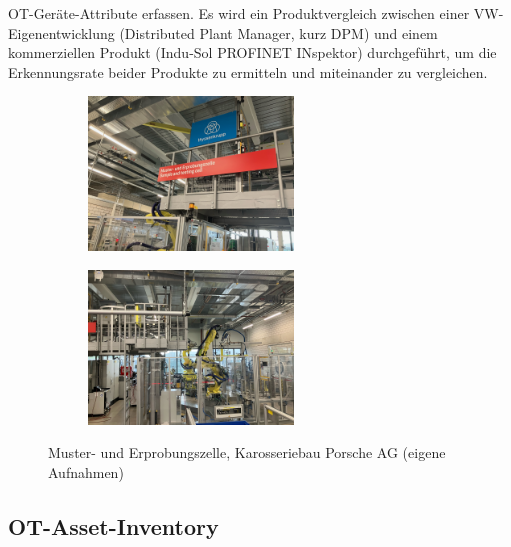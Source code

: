OT-Geräte-Attribute erfassen. \clearpage \noindent Es wird ein Produktvergleich zwischen einer VW-Eigenentwicklung (Distributed Plant Manager, kurz DPM) und einem kommerziellen Produkt (Indu-Sol PROFINET INspektor) durchgeführt, um die Erkennungsrate beider Produkte zu ermitteln und miteinander zu vergleichen. 
\bigskip
\begin{figure}[!h]
    \centering
    \begin{subfigure}[b]{\textwidth}
        \centering
        \includegraphics[width=0.6\textwidth]{images/Musterzelle.jpg}
        \caption{}
        \label{fig:Testzelle1}
    \end{subfigure}
    \vskip 0.5cm %
    \begin{subfigure}[b]{\textwidth}
        \centering
        \includegraphics[width=0.6\textwidth]{images/Mustertestzelle1.jpg}
        \label{fig:Testzelle2}
        \caption{}
    \end{subfigure}
    \caption{Muster- und Erprobungszelle, Karosseriebau Porsche AG (eigene Aufnahmen)}
    \label{fig:CombinedTestzellen}
\end{figure}
\clearpage

\subsection{OT-Asset-Inventory}

